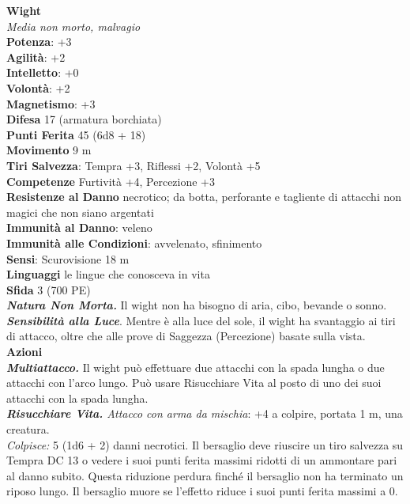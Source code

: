 \begin{multicols}{2}
\medskip\textbf{Wight}\\
\emph{Media non morto, malvagio}\\
\textbf{Potenza}: +3\\
\textbf{Agilità}: +2\\
\textbf{Intelletto}: +0\\
\textbf{Volontà}: +2\\
\textbf{Magnetismo}: +3\\
\textbf{Difesa} 17 (armatura borchiata)\\
\textbf{Punti Ferita} 45 (6d8 + 18)\\
\textbf{Movimento} 9 m\\
\textbf{Tiri Salvezza}: Tempra +3, Riflessi +2, Volontà +5\\
\textbf{Competenze} Furtività +4, Percezione +3\\
\textbf{Resistenze al Danno} necrotico; da botta, perforante e tagliente di attacchi non magici che non siano argentati \\
\textbf{Immunità al Danno}: veleno\\
\textbf{Immunità alle Condizioni}: avvelenato, sfinimento\\
\textbf{Sensi}: Scurovisione 18 m\\
\textbf{Linguaggi} le lingue che conosceva in vita\\
\textbf{Sfida} 3 (700 PE)\smallskip\\
\emph{\textbf{Natura Non Morta.}} Il wight non ha bisogno di aria, cibo, bevande o sonno.\\
\emph{\textbf{Sensibilità alla Luce}}. Mentre è alla luce del sole, il wight ha svantaggio ai tiri di attacco, oltre che alle prove di Saggezza (Percezione) basate sulla vista.\\
\smallskip\textbf{Azioni}\\
\emph{\textbf{Multiattacco.}} Il wight può effettuare due attacchi con la spada lungha o due attacchi con l'arco lungo. Può usare Risucchiare Vita al posto di uno dei suoi attacchi con la spada lungha.\\
\emph{\textbf{Risucchiare Vita.} Attacco con arma da mischia}: +4 a colpire, portata 1 m, una creatura.\\
\emph{Colpisce:} 5 (1d6 + 2) danni necrotici. Il bersaglio deve riuscire un tiro salvezza su Tempra DC 13 o vedere i suoi punti ferita massimi ridotti di un ammontare pari al danno subito. Questa riduzione perdura finché il bersaglio non ha terminato un riposo lungo. Il bersaglio muore se l'effetto riduce i suoi punti ferita massimi a 0.\\


\end{multicols}
